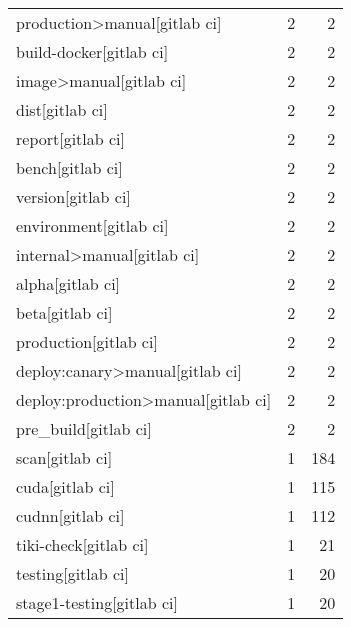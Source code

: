 \begin{tabular}{lrr}
production>manual[gitlab ci]               &                   2 &             2 \\
build-docker[gitlab ci]                    &                   2 &             2 \\
image>manual[gitlab ci]                    &                   2 &             2 \\
dist[gitlab ci]                            &                   2 &             2 \\
report[gitlab ci]                          &                   2 &             2 \\
bench[gitlab ci]                           &                   2 &             2 \\
version[gitlab ci]                         &                   2 &             2 \\
environment[gitlab ci]                     &                   2 &             2 \\
internal>manual[gitlab ci]                 &                   2 &             2 \\
alpha[gitlab ci]                           &                   2 &             2 \\
beta[gitlab ci]                            &                   2 &             2 \\
production[gitlab ci]                      &                   2 &             2 \\
deploy:canary>manual[gitlab ci]            &                   2 &             2 \\
deploy:production>manual[gitlab ci]        &                   2 &             2 \\
pre\_build[gitlab ci]                       &                   2 &             2 \\
scan[gitlab ci]                            &                   1 &           184 \\
cuda[gitlab ci]                            &                   1 &           115 \\
cudnn[gitlab ci]                           &                   1 &           112 \\
tiki-check[gitlab ci]                      &                   1 &            21 \\
testing[gitlab ci]                         &                   1 &            20 \\
stage1-testing[gitlab ci]                  &                   1 &            20 \\

\end{tabular}
